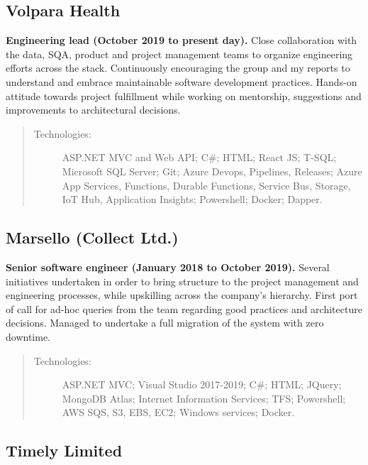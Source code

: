 \subsection*{Volpara Health}

\textbf{Engineering lead (October 2019 to present day).} Close collaboration with the data, SQA, product and project management teams to organize engineering efforts across the stack. Continuously encouraging the group and my reports to understand and embrace maintainable software development practices. Hands-on attitude towards project fulfillment while working on mentorship, suggestions and improvements to architectural decisions.

\begin{quote}
\begin{description}
    \item[Technologies:] ASP.NET MVC and Web API; C\#; HTML; React JS; T-SQL; Microsoft SQL Server; Git; Azure Devops, Pipelines, Releases; Azure App Services, Functions, Durable Functions, Service Bus, Storage, IoT Hub, Application Insights; Powershell; Docker; Dapper.
\end{description}
\end{quote}

\subsection*{Marsello (Collect Ltd.)}

\textbf{Senior software engineer (January 2018 to October 2019).} Several initiatives undertaken in order to bring structure to the project management and engineering processes, while upskilling across the company's hierarchy. First port of call for ad-hoc queries from the team regarding good practices and architecture decisions. Managed to undertake a full migration of the system with zero downtime.

\begin{quote}
\begin{description}
    \item[Technologies:] ASP.NET MVC; Visual Studio 2017-2019; C\#; HTML; JQuery; MongoDB Atlas; Internet Information Services; TFS; Powershell; AWS SQS, S3, EBS, EC2; Windows services; Docker.
\end{description}
\end{quote}

\subsection*{Timely Limited}

